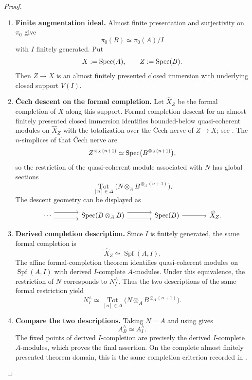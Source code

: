 \begin{proof}
\leavevmode
\begin{enumerate}[label=\textup{(\arabic*)}]
    \item \textbf{Finite augmentation ideal.}
    Almost finite presentation and surjectivity on \(\pi_0\) give
    \[
        \pi_0(B)\simeq\pi_0(A)/I
    \]
    with \(I\) finitely generated. Put
    \[
        X:=\operatorname{Spec}(A),
        \qquad
        Z:=\operatorname{Spec}(B).
    \]
    Then \(Z\to X\) is an almost finitely presented closed immersion with
    underlying closed support \(V(I)\).
    \item \textbf{Čech descent on the formal completion.}
    Let \(\widehat X_Z\) be the formal completion of \(X\) along this support.
    Formal-completion descent for an almost finitely presented closed immersion
    identifies bounded-below quasi-coherent modules on \(\widehat X_Z\) with the
    totalization over the Čech nerve of \(Z\to X\); see
    \cite[Corollary~3.1.6]{HalpernLeistnerPreygel2023}. The \(n\)-simplices of
    that Čech nerve are
    \[
        Z^{\times_X(n+1)}
        \simeq
        \operatorname{Spec}\bigl(B^{\otimes_A(n+1)}\bigr),
    \]
    so the restriction of the quasi-coherent module associated with \(N\) has
    global sections
    \[
        \operatorname*{Tot}_{[n]\in\Delta}
        \bigl(N\otimes_A B^{\otimes_A(n+1)}\bigr).
    \]
    The descent geometry can be displayed as
    \[
    \begin{tikzcd}[column sep=large,row sep=large]
        \cdots
            \arrow[r,shift left=1.1ex]
            \arrow[r,shift right=1.1ex]
            &
        \Spec(B\otimes_A B)
            \arrow[r,shift left=1.1ex]
            \arrow[r,shift right=1.1ex]
            &
        \Spec(B)
            \arrow[r]
            &
        \widehat X_Z .
    \end{tikzcd}
    \]
    \item \textbf{Derived completion description.}
    Since \(I\) is finitely generated, the same formal completion is
    \[
        \widehat X_Z
        \simeq
        \operatorname{Spf}(A,I).
    \]
    The affine formal-completion theorem
    \cite[Corollary~8.2.4.15]{LurieSAG} identifies quasi-coherent modules on
    \(\operatorname{Spf}(A,I)\) with derived \(I\)-complete \(A\)-modules. Under
    this equivalence, the restriction of \(N\) corresponds to \(N_I^\wedge\).
    Thus the two descriptions of the same formal restriction yield
    \[
        N_I^\wedge
        \simeq
        \operatorname*{Tot}_{[n]\in\Delta}
        \bigl(N\otimes_A B^{\otimes_A(n+1)}\bigr).
    \]
    \item \textbf{Compare the two descriptions.}
    Taking \(N=A\) and using
     gives
    \[
        A_B^\wedge\simeq A_I^\wedge.
    \]
    The fixed points of derived \(I\)-completion are precisely the derived
    \(I\)-complete \(A\)-modules, which proves the final assertion. On the
    complete almost finitely presented theorem domain, this is the same
    completion criterion recorded in
    \cite[Proposition~2.18]{BrantnerMagidsonNuiten}.
\end{enumerate}
\end{proof}



